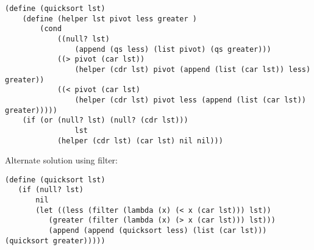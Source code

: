 \begin{blocksection}

\begin{solution}[0.5in]
\begin{lstlisting}
(define (quicksort lst)
    (define (helper lst pivot less greater )
        (cond
            ((null? lst) 
                (append (qs less) (list pivot) (qs greater)))
            ((> pivot (car lst)) 
                (helper (cdr lst) pivot (append (list (car lst)) less) greater))
            ((< pivot (car lst)
                (helper (cdr lst) pivot less (append (list (car lst)) greater)))))
    (if (or (null? lst) (null? (cdr lst))) 
		        lst 
            (helper (cdr lst) (car lst) nil nil)))

\end{lstlisting}

Alternate solution using filter:

\begin{lstlisting}
(define (quicksort lst)
   (if (null? lst)
       nil
       (let ((less (filter (lambda (x) (< x (car lst))) lst))
          (greater (filter (lambda (x) (> x (car lst))) lst)))
          (append (append (quicksort less) (list (car lst))) (quicksort greater)))))
\end{lstlisting}

\end{solution}
\end{blocksection}
